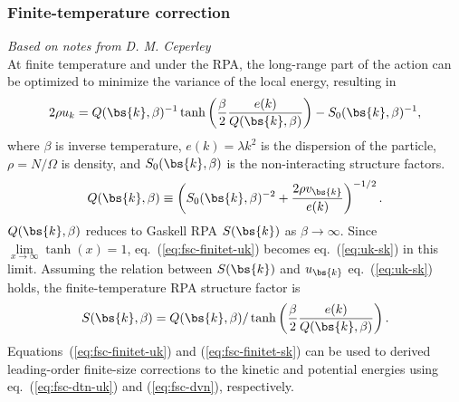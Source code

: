 \subsubsection{Finite-temperature correction}
\textit{Based on notes from D. M. Ceperley}\\
At finite temperature and under the RPA, the long-range part of the action can be optimized to minimize the variance of the local energy, resulting in
\begin{align} \label{eq:fsc-finitet-uk}
2\rho u_k = Q(\bs{k}, \beta)^{-1}\tanh\left(
\dfrac{\beta}{2}\dfrac{e(k)}{Q(\bs{k}, \beta)}
\right) - S_0(\bs{k},\beta)^{-1},
\end{align}
where $\beta$ is inverse temperature, $e(k)=\lambda k^2$ is the dispersion of the particle, $\rho=N/\Omega$ is density, and $S_0(\bs{k}, \beta)$ is the non-interacting structure factors.
\begin{align}
Q(\bs{k}, \beta) \equiv \left(S_0(\bs{k}, \beta)^{-2}+\dfrac{2\rho v_{\bs{k}}}{e(k)}\right)^{-1/2}.
\end{align}
$Q(\bs{k}, \beta)$ reduces to Gaskell RPA $S(\bs{k})$ as $\beta\rightarrow\infty$. Since $\lim\limits_{x\rightarrow\infty}\tanh(x)=1$, eq.~(\ref{eq:fsc-finitet-uk}) becomes eq.~(\ref{eq:uk-sk}) in this limit. Assuming the relation between $S(\bs{k})$ and $u_{\bs{k}}$ eq.~(\ref{eq:uk-sk}) holds, the finite-temperature RPA structure factor is
\begin{align} \label{eq:fsc-finitet-sk}
S(\bs{k},\beta) = Q(\bs{k},\beta)/\tanh\left(
\dfrac{\beta}{2}\dfrac{e(k)}{Q(\bs{k}, \beta)}
\right).
\end{align}
Equations~(\ref{eq:fsc-finitet-uk}) and (\ref{eq:fsc-finitet-sk}) can be used to derived leading-order finite-size corrections to the kinetic and potential energies using eq.~(\ref{eq:fsc-dtn-uk}) and (\ref{eq:fsc-dvn}), respectively.


